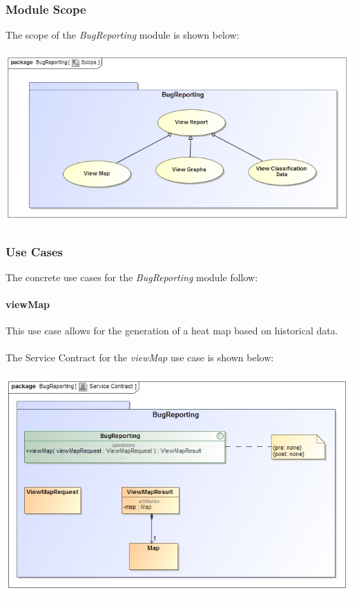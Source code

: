 \documentclass[11pt,a4paper,titlepage]{article}
\begin{document}
		\subsubsection{Module Scope}
		The scope of the \textit{BugReporting} module is shown below:\\
		\hfill\\
			\includegraphics[width=\linewidth]{ReportingScope}
		\subsubsection{Use Cases}
		The concrete use cases for the \textit{BugReporting} module follow:
		\paragraph{viewMap }
		This use case allows for the generation of a heat map based on historical data.\\\hfill\\
		The Service Contract for the \textit{viewMap} use case is shown below:\\\hfill\\		
		\includegraphics[width=\linewidth]{viewMapSC}
		
\end{document}
